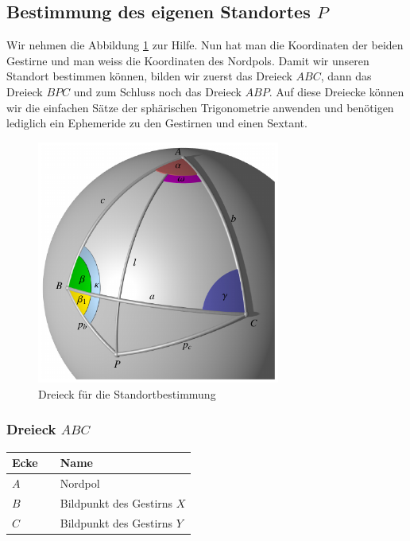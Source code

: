 \subsection{Bestimmung des eigenen Standortes $P$} \label{p}
Wir nehmen die Abbildung \ref{d2} zur Hilfe.
Nun hat man die Koordinaten der beiden Gestirne und man weiss die Koordinaten des Nordpols.
Damit wir unseren Standort bestimmen können, bilden wir zuerst das Dreieck $ABC$, dann das Dreieck $BPC$ und zum Schluss noch das Dreieck $ABP$.
Auf diese Dreiecke können wir die einfachen Sätze der sphärischen Trigonometrie anwenden und benötigen lediglich ein Ephemeride zu den Gestirnen und einen Sextant.

\begin{figure}
	\begin{center}
		\includegraphics[width=8cm]{papers/nav/bilder/dreieck.pdf}
		\caption[Dreieck für die Standortbestimmung]{Dreieck für die Standortbestimmung}
		\label{d2}
	\end{center}
\end{figure}

\subsubsection{Dreieck $ABC$}

\begin{center}
	\begin{tabular}{ l l l }
		Ecke && Name  \\ 
		\hline
		$A$ && Nordpol \\  
		$B$ && Bildpunkt des Gestirns $X$ \\
		$C$&& Bildpunkt des Gestirns $Y$
	\end{tabular}
\end{center}

